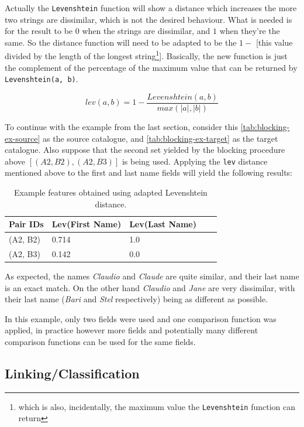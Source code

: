 \documentclass[epsfig,a4paper,11pt,titlepage,twoside,openany]{book}
\begin{document}
Actually the \texttt{Levenshtein} function will show a distance which increases the more two strings are dissimilar, which is not the desired behaviour. What is needed is for the result to be $0$ when the strings are dissimilar, and $1$ when they're the same. So the distance function will need to be adapted to be the $1 -$ [this value divided by the length of the longest string\footnote{which is also, incidentally, the maximum value the \texttt{Levenshtein} function can return}]. Basically, the new function is just the complement of the percentage of the maximum value that can be returned by \texttt{Levenshtein(a, b)}.

$$
lev(a,b) = 1 - \frac{Levenshtein(a, b)}{max(|a|, |b|)}
$$

To continue with the example from the last section, consider this \autoref{tab:blocking-ex-source} as the source catalogue, and \autoref{tab:blocking-ex-target} as the target catalogue. Also suppose that the second
set yielded by the blocking procedure above $[(A2, B2), (A2, B3)]$ is being used. Applying the
\texttt{lev} distance mentioned above to the first and last name fields will
yield the following results:

\begin{table}[H]
  \centering
  \begin{tabular}{l|l|l|l|l}
    Pair IDs & Lev(First Name) & Lev(Last Name) \\ \hline
    (A2, B2) & 0.714           & 1.0            \\
    (A2, B3) & 0.142           & 0.0           
  \end{tabular}
  \caption{Example features obtained using adapted Levenshtein distance.}
  \label{tab:ex-feature-levens}
\end{table}

As expected, the names \textit{Claudio} and \textit{Claude} are quite similar,
and their last name is an exact match. On the other hand \textit{Claudio} and
\textit{Jane} are very dissimilar, with their last name (\textit{Bari} and
\textit{Stel} respectively) being as different as possible.

In this example, only two fields were used and one comparison function was applied, in practice
however more fields and potentially many different comparison
functions can be used for the same fields.


\subsection{Linking/Classification}
\label{sec:rl-workflow-linking}
\end{document}
